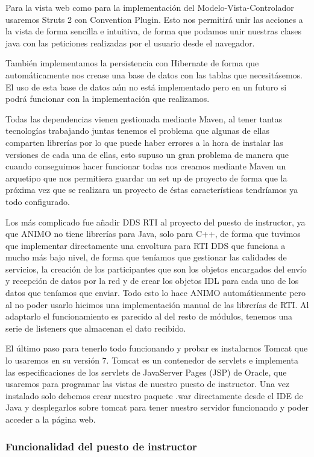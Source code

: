 \documentclass[12pt,a4paper,spanish]{book} %
\begin{document}
Para la vista web como para la implementación del Modelo-Vista-Controlador usaremos Struts 2 con Convention Plugin. Esto nos permitirá unir las acciones a la vista de forma sencilla e intuitiva, de forma que podamos unir nuestras clases java con las peticiones realizadas por el usuario desde el navegador.

También implementamos la persistencia con Hibernate de forma que automáticamente nos crease una base de datos con las tablas que necesitásemos. El uso de esta base de datos aún no está implementado pero en un futuro si podrá funcionar con la implementación que realizamos.

Todas las dependencias vienen gestionada mediante Maven, al tener tantas tecnologías trabajando juntas tenemos el problema que algunas de ellas comparten librerías por lo que puede haber errores a la hora de instalar las versiones de cada una de ellas, esto supuso un gran problema de manera que cuando conseguimos hacer funcionar todas nos creamos mediante Maven un arquetipo que nos permitiera guardar un set up de proyecto de forma que la próxima vez que se realizara un proyecto de éstas características tendríamos ya todo configurado.

Los más complicado fue añadir DDS RTI al proyecto del puesto de instructor, ya que ANIMO no tiene librerías para Java, solo para C++, de forma que tuvimos que implementar directamente una envoltura para RTI DDS que funciona a mucho más bajo nivel, de forma que teníamos que gestionar las calidades de servicios, la creación de los participantes que son los objetos encargados del envío y recepción de datos por la red y de crear los objetos IDL para cada uno de los datos que teníamos que enviar. Todo esto lo hace ANIMO automáticamente pero al no poder usarlo hicimos una implementación manual de las librerías de RTI. Al adaptarlo el funcionamiento es parecido al del resto de módulos, tenemos una serie de listeners que almacenan el dato recibido.

El último paso para tenerlo todo funcionando y probar es instalarnos Tomcat que lo usaremos en su versión 7. Tomcat es un contenedor de servlets e implementa las especificaciones de los servlets de JavaServer Pages (JSP) de Oracle, que usaremos para programar las vistas de nuestro puesto de instructor. Una vez instalado solo debemos crear nuestro paquete .war directamente desde el IDE de Java y desplegarlos sobre tomcat para tener nuestro servidor funcionando y poder acceder a la página web.

\subsubsection{Funcionalidad del puesto de instructor}
\end{document}
